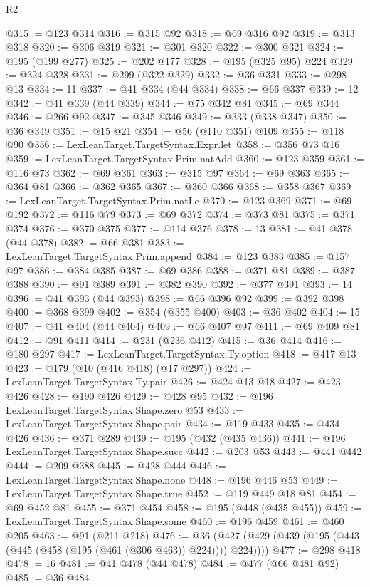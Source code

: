 \begin{lexlean}{R2}
\begin{coremodule}
@315 := @123 @314
@316 := @315 @92
@318 := @69 @316 @92
@319 := @313 @318
@320 := @306 @319
@321 := @301 @320
@322 := @300 @321
@324 := @195 (@199 @277)
@325 := @202 @177
@328 := @195 (@325 @95) @224
@329 := @324 @328
@331 := @299 (@322 @329)
@332 := @36 @331
@333 := @298 @13
@334 := 11
@337 := @41 @334 (@44 @334)
@338 := @66 @337
@339 := 12
@342 := @41 @339 (@44 @339)
@344 := @75 @342 @81
@345 := @69 @344
@346 := @266 @92
@347 := @345 @346
@349 := @333 (@338 @347)
@350 := @36 @349
@351 := @15 @21
@354 := @56 (@110 @351) @109
@355 := @118 @90
@356 := LexLeanTarget.TargetSyntax.Expr.let
@358 := @356 @73 @16
@359 := LexLeanTarget.TargetSyntax.Prim.natAdd
@360 := @123 @359
@361 := @116 @73
@362 := @69 @361
@363 := @315 @97
@364 := @69 @363
@365 := @364 @81
@366 := @362 @365
@367 := @360 @366
@368 := @358 @367
@369 := LexLeanTarget.TargetSyntax.Prim.natLe
@370 := @123 @369
@371 := @69 @192
@372 := @116 @79
@373 := @69 @372
@374 := @373 @81
@375 := @371 @374
@376 := @370 @375
@377 := @114 @376
@378 := 13
@381 := @41 @378 (@44 @378)
@382 := @66 @381
@383 := LexLeanTarget.TargetSyntax.Prim.append
@384 := @123 @383
@385 := @157 @97
@386 := @384 @385
@387 := @69 @386
@388 := @371 @81
@389 := @387 @388
@390 := @91 @389
@391 := @382 @390
@392 := @377 @391
@393 := 14
@396 := @41 @393 (@44 @393)
@398 := @66 @396 @92
@399 := @392 @398
@400 := @368 @399
@402 := @354 (@355 @400)
@403 := @36 @402
@404 := 15
@407 := @41 @404 (@44 @404)
@409 := @66 @407 @97
@411 := @69 @409 @81
@412 := @91 @411
@414 := @231 (@236 @412)
@415 := @36 @414
@416 := @180 @297
@417 := LexLeanTarget.TargetSyntax.Ty.option
@418 := @417 @13
@423 := @179 (@10 (@416 @418) (@17 @297))
@424 := LexLeanTarget.TargetSyntax.Ty.pair
@426 := @424 @13 @18
@427 := @423 @426
@428 := @190 @426
@429 := @428 @95
@432 := @196 LexLeanTarget.TargetSyntax.Shape.zero @53
@433 := LexLeanTarget.TargetSyntax.Shape.pair
@434 := @119 @433
@435 := @434 @426
@436 := @371 @289
@439 := @195 (@432 (@435 @436))
@441 := @196 LexLeanTarget.TargetSyntax.Shape.succ
@442 := @203 @53
@443 := @441 @442
@444 := @209 @388
@445 := @428 @444
@446 := LexLeanTarget.TargetSyntax.Shape.none
@448 := @196 @446 @53
@449 := LexLeanTarget.TargetSyntax.Shape.true
@452 := @119 @449 @18 @81
@454 := @69 @452 @81
@455 := @371 @454
@458 := @195 (@448 (@435 @455))
@459 := LexLeanTarget.TargetSyntax.Shape.some
@460 := @196 @459
@461 := @460 @205
@463 := @91 (@211 @218)
@476 := @36 (@427 (@429 (@439 (@195 (@443 (@445 (@458 (@195 (@461 (@306 @463)) @224)))) @224))))
@477 := @298 @418
@478 := 16
@481 := @41 @478 (@44 @478)
@484 := @477 (@66 @481 @92)
@485 := @36 @484

\end{coremodule}
\end{lexlean}
